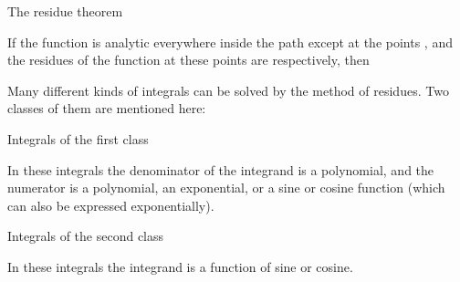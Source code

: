 \begin{EMtheorem}{The residue theorem}

If the function  is analytic everywhere inside the path  except at the points , and the residues of the function at these points are  respectively, then

\end{EMtheorem}

Many different kinds of integrals can be solved by the method of residues. Two classes of them are mentioned here:

\begin{EMdefinition}{Integrals of the first class}

In these integrals the denominator of the integrand is a polynomial, and the numerator is a polynomial, an exponential, or a sine or cosine function (which can also be expressed exponentially).

\end{EMdefinition}

\begin{EMdefinition}{Integrals of the second class}

In these integrals the integrand is a function of sine or cosine.

\end{EMdefinition}

\EMhold



